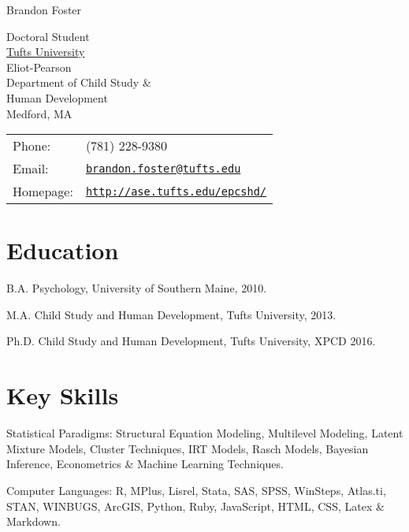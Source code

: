\documentclass[letterpaper]{article}
\def\name{Brandon Foster}
\renewenvironment{itemize}{
  \begin{list}{}{
    \setlength{\leftmargin}{1.5em}
  }
}{
  \end{list}
}
\begin{document}
{\huge \name}


\vspace{0.25in}

\begin{minipage}{0.45\linewidth}
  Doctoral Student \\
  \href{http://ase.tufts.edu/epcshd/}{Tufts University} \\
  Eliot-Pearson \\
  Department of Child Study \& \\ 
  Human Development \\
  Medford, MA
\end{minipage}
\begin{minipage}{0.45\linewidth}
  \begin{tabular}{ll}
    Phone: & (781) 228-9380 \\
    Email: & \href{mailto:brandon.foster@tufts.edu}{\tt brandon.foster@tufts.edu} \\
    Homepage: & \href{http://ase.tufts.edu/epcshd/}{\tt http://ase.tufts.edu/epcshd/} \\
  \end{tabular}
\end{minipage}

\section*{Education}

\begin{itemize}
  \item B.A. Psychology, University of Southern Maine, 2010.

  \item M.A. Child Study and Human Development, Tufts University, 2013.

  \item Ph.D. Child Study and Human Development, Tufts University, XPCD 2016.
\end{itemize}

\section*{Key Skills}

\begin{itemize}
\item Statistical Paradigms: Structural Equation Modeling, Multilevel Modeling, Latent Mixture Models, Cluster Techniques, IRT Models, Rasch Models, Bayesian Inference, Econometrics \& Machine Learning Techniques.
\item Computer Languages: R, MPlus, Lisrel, Stata, SAS, SPSS, WinSteps, Atlas.ti, STAN, WINBUGS, ArcGIS, Python, Ruby, JavaScript, HTML, CSS, Latex \& Markdown. 
\end{itemize}
\end{document}
